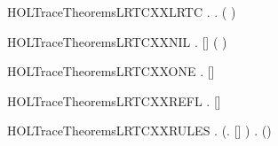 \newcommand{\HOLTraceTheoremsLRTCXXINDUCT}{\UseVerbatim{HOLTraceTheoremsLRTCXXINDUCT}}
\begin{SaveVerbatim}{HOLTraceTheoremsLRTCXXLRTC}
\HOLTokenTurnstile{} \HOLSymConst{\HOLTokenForall{}}   .
            \HOLSymConst{\HOLTokenImp{}} \HOLSymConst{\HOLTokenForall{}} .      \HOLSymConst{\HOLTokenImp{}}    ( \HOLSymConst{++} ) 
\end{SaveVerbatim}
\newcommand{\HOLTraceTheoremsLRTCXXLRTC}{\UseVerbatim{HOLTraceTheoremsLRTCXXLRTC}}
\begin{SaveVerbatim}{HOLTraceTheoremsLRTCXXNIL}
\HOLTokenTurnstile{} \HOLSymConst{\HOLTokenForall{}}  .    []  \HOLSymConst{\HOLTokenEquiv{}} ( \HOLSymConst{=} )
\end{SaveVerbatim}
\newcommand{\HOLTraceTheoremsLRTCXXNIL}{\UseVerbatim{HOLTraceTheoremsLRTCXXNIL}}
\begin{SaveVerbatim}{HOLTraceTheoremsLRTCXXONE}
\HOLTokenTurnstile{} \HOLSymConst{\HOLTokenForall{}}   .    []  \HOLSymConst{\HOLTokenEquiv{}}    
\end{SaveVerbatim}
\newcommand{\HOLTraceTheoremsLRTCXXONE}{\UseVerbatim{HOLTraceTheoremsLRTCXXONE}}
\begin{SaveVerbatim}{HOLTraceTheoremsLRTCXXREFL}
\HOLTokenTurnstile{} \HOLSymConst{\HOLTokenForall{}}.    [] 
\end{SaveVerbatim}
\newcommand{\HOLTraceTheoremsLRTCXXREFL}{\UseVerbatim{HOLTraceTheoremsLRTCXXREFL}}
\begin{SaveVerbatim}{HOLTraceTheoremsLRTCXXRULES}
\HOLTokenTurnstile{} \HOLSymConst{\HOLTokenForall{}}.
       (\HOLSymConst{\HOLTokenForall{}}.    [] ) \HOLSymConst{\HOLTokenConj{}}
       \HOLSymConst{\HOLTokenForall{}}    .     \HOLSymConst{\HOLTokenConj{}}      \HOLSymConst{\HOLTokenImp{}}    (\HOLSymConst{::}) 
\end{SaveVerbatim}
